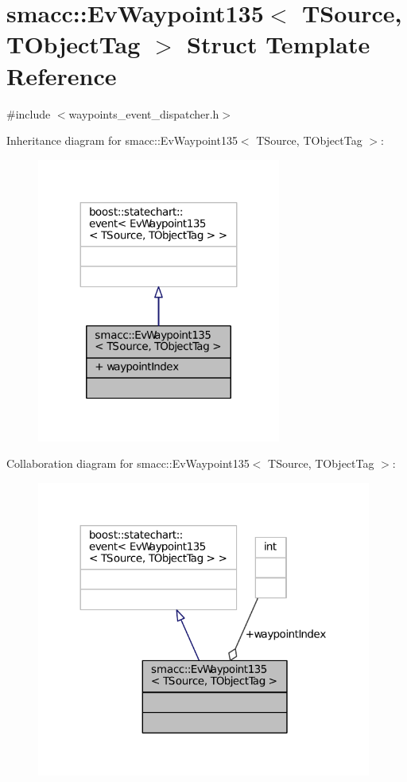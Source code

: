 \hypertarget{structsmacc_1_1EvWaypoint135}{}\section{smacc\+:\+:Ev\+Waypoint135$<$ T\+Source, T\+Object\+Tag $>$ Struct Template Reference}
\label{structsmacc_1_1EvWaypoint135}


{\ttfamily \#include $<$waypoints\+\_\+event\+\_\+dispatcher.\+h$>$}



Inheritance diagram for smacc\+:\+:Ev\+Waypoint135$<$ T\+Source, T\+Object\+Tag $>$\+:
\nopagebreak
\begin{figure}[H]
\begin{center}
\leavevmode
\includegraphics[width=227pt]{structsmacc_1_1EvWaypoint135__inherit__graph}
\end{center}
\end{figure}


Collaboration diagram for smacc\+:\+:Ev\+Waypoint135$<$ T\+Source, T\+Object\+Tag $>$\+:
\nopagebreak
\begin{figure}[H]
\begin{center}
\leavevmode
\includegraphics[width=312pt]{structsmacc_1_1EvWaypoint135__coll__graph}
\end{center}
\end{figure}
